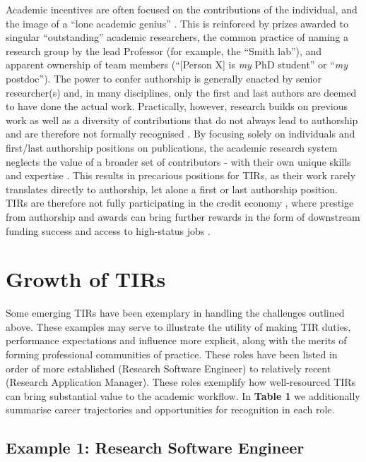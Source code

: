 \documentclass[authordate,meta,issue]{jote-new-article}
\begin{document}
Academic incentives are often focused on the contributions of the individual, and the image of a “lone academic genius” \parencites{Elkins-tanton2021}. This is reinforced by prizes awarded to singular “outstanding” academic researchers, the common practice of naming a research group by the lead Professor (for example, the “Smith lab”), and apparent ownership of team members (“[Person X] is \emph{my} PhD student” or “\emph{my} postdoc”). The power to confer authorship is generally enacted by senior researcher(s) and, in many disciplines, only the first and last authors are deemed to have done the actual work. Practically, however, research builds on previous work as well as a diversity of contributions that do not always lead to authorship and are therefore not formally recognised \parencites{Coles2022}{Forscher2020}{Shirazi2014}{Tiokhin2021}. By focusing solely on individuals and first/last authorship positions on publications, the academic research system neglects the value of a broader set of contributors - with their own unique skills and expertise \parencites{Baum2022}. This results in precarious positions for TIRs, as their work rarely translates directly to authorship, let alone a first or last authorship position. TIRs are therefore not fully participating in the credit economy \parencites{Zollman2018}, where prestige from authorship and awards can bring further rewards in the form of downstream funding success and access to high-status jobs \parencites{Huebner2020}.



\section{Growth of TIRs}



Some emerging TIRs have been exemplary in handling the challenges outlined above. These examples may serve to illustrate the utility of making TIR duties, performance expectations and influence more explicit, along with the merits of forming professional communities of practice. These roles have been listed in order of more established (Research Software Engineer) to relatively recent (Research Application Manager). These roles exemplify how well-resourced TIRs can bring substantial value to the academic workflow. In \textbf{Table 1} we additionally summarise career trajectories and opportunities for recognition in each role.



\subsection{Example 1: Research Software Engineer}
\end{document}
